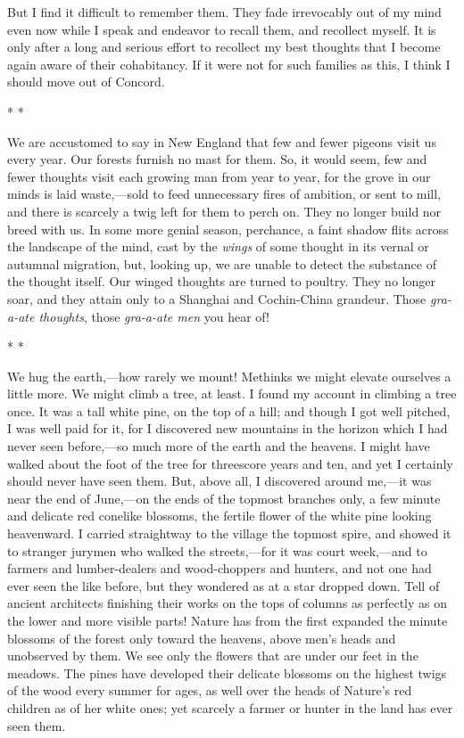 \documentclass[twoside,openright,10pt]{memoir} %
\begin{document}
But I find it difficult to remember them. They fade irrevocably out of my mind even now while I speak and endeavor to recall them, and recollect myself. It is only after a long and serious effort to recollect my best thoughts that I become again aware of their cohabitancy. If it were not for such families as this, I think I should move out of Concord.
\begin{center}\tiny * * * \normalsize \end{center}
We are accustomed to say in New England that few and fewer pigeons visit us every year. Our forests furnish no mast for them. So, it would seem, few and fewer thoughts visit each growing man from year to year, for the grove in our minds is laid waste,—sold to feed unnecessary fires of ambition, or sent to mill, and there is scarcely a twig left for them to perch on. They no longer build nor breed with us. In some more genial season, perchance, a faint shadow flits across the landscape of the mind, cast by the \emph{wings} of some thought in its vernal or autumnal migration, but, looking up, we are unable to detect the substance of the thought itself. Our winged thoughts are turned to poultry. They no longer soar, and they attain only to a Shanghai and Cochin-China grandeur. Those \emph{gra-a-ate thoughts}, those \emph{gra-a-ate men} you hear of!
\begin{center}\tiny * * * \normalsize \end{center}
We hug the earth,—how rarely we mount! Methinks we might elevate ourselves a little more. We might climb a tree, at least. I found my account in climbing a tree once. It was a tall white pine, on the top of a hill; and though I got well pitched, I was well paid for it, for I discovered new mountains in the horizon which I had never seen before,—so much more of the earth and the heavens. I might have walked about the foot of the tree for threescore years and ten, and yet I certainly should never have seen them. But, above all, I discovered around me,—it was near the end of June,—on the ends of the topmost branches only, a few minute and delicate red conelike blossoms, the fertile flower of the white pine looking heavenward. I carried straightway to the village the topmost spire, and showed it to stranger jurymen who walked the streets,—for it was court week,—and to farmers and lumber-dealers and wood-choppers and hunters, and not one had ever seen the like before, but they wondered as at a star dropped down. Tell of ancient architects finishing their works on the tops of columns as perfectly as on the lower and more visible parts! Nature has from the first expanded the minute blossoms of the forest only toward the heavens, above men’s heads and unobserved by them. We see only the flowers that are under our feet in the meadows. The pines have developed their delicate blossoms on the highest twigs of the wood every summer for ages, as well over the heads of Nature’s red children as of her white ones; yet scarcely a farmer or hunter in the land has ever seen them.
\end{document}
